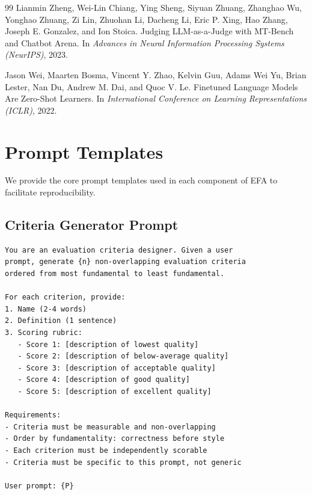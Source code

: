\documentclass[11pt]{article}
\newcommand{\efa}{\textsc{EFA}}  %
\begin{document}
\begin{thebibliography}{99}
Lianmin Zheng, Wei-Lin Chiang, Ying Sheng, Siyuan Zhuang, Zhanghao Wu, Yonghao Zhuang, Zi Lin, Zhuohan Li, Dacheng Li, Eric P. Xing, Hao Zhang, Joseph E. Gonzalez, and Ion Stoica.
\newblock Judging LLM-as-a-Judge with MT-Bench and Chatbot Arena.
\newblock In \emph{Advances in Neural Information Processing Systems (NeurIPS)}, 2023.

Jason Wei, Maarten Bosma, Vincent Y. Zhao, Kelvin Guu, Adams Wei Yu, Brian Lester, Nan Du, Andrew M. Dai, and Quoc V. Le.
\newblock Finetuned Language Models Are Zero-Shot Learners.
\newblock In \emph{International Conference on Learning Representations (ICLR)}, 2022.

\end{thebibliography}

\appendix
\section{Prompt Templates}
\label{app:prompts}

We provide the core prompt templates used in each component of \efa{} to facilitate reproducibility.

\subsection{Criteria Generator Prompt}

\begin{small}
\begin{verbatim}
You are an evaluation criteria designer. Given a user
prompt, generate {n} non-overlapping evaluation criteria
ordered from most fundamental to least fundamental.

For each criterion, provide:
1. Name (2-4 words)
2. Definition (1 sentence)
3. Scoring rubric:
   - Score 1: [description of lowest quality]
   - Score 2: [description of below-average quality]
   - Score 3: [description of acceptable quality]
   - Score 4: [description of good quality]
   - Score 5: [description of excellent quality]

Requirements:
- Criteria must be measurable and non-overlapping
- Order by fundamentality: correctness before style
- Each criterion must be independently scorable
- Criteria must be specific to this prompt, not generic

User prompt: {P}
\end{verbatim}
\end{small}
\end{document}
